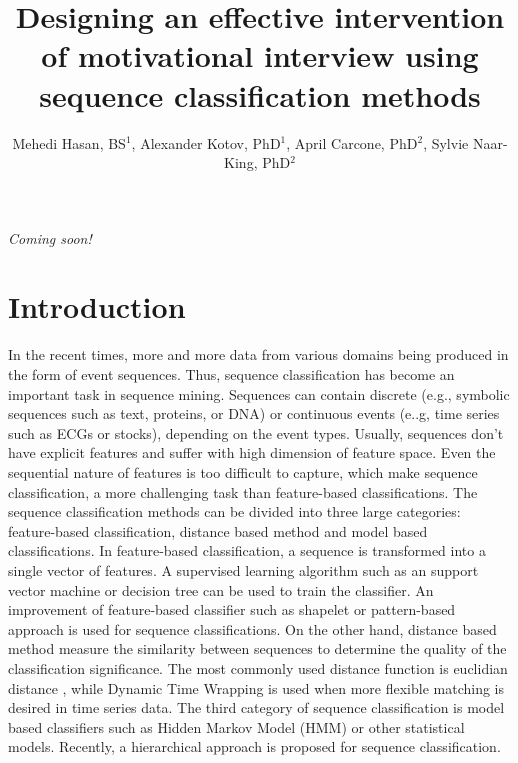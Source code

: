 \documentclass{amia}
\begin{document}
\title{Designing an effective intervention of motivational interview using sequence classification methods}

\author{Mehedi Hasan, BS$^{1}$, Alexander Kotov, PhD$^{1}$, April Carcone, PhD$^{2}$, Sylvie Naar-King, PhD$^{2}$}


\maketitle

\textit{Coming soon!}

\section*{Introduction}

In the recent times, more and more data from various domains being produced in the form of event sequences. Thus, sequence classification has become an important task in sequence mining. Sequences can contain discrete (e.g., symbolic sequences such as text, proteins, or DNA) or continuous events (e..g, time series such as ECGs or stocks), depending on the event types. Usually, sequences don't have explicit features and suffer with high dimension of feature space. Even the sequential nature of features is too difficult to capture, which make sequence classification, a more challenging task than feature-based classifications. The sequence classification methods can be divided into three large categories: feature-based classification, distance based method and model based classifications. In feature-based classification, a sequence is transformed into a single vector of features. A supervised learning algorithm such as an support vector machine \cite{leslie2004fast} or decision tree \cite{chuzhanova1998feature} can be used to train the classifier. An improvement of feature-based classifier such as shapelet \cite{ye2009time} or pattern-based \cite{kudenko1998feature, lesh1999mining} approach is used for sequence classifications. On the other hand, distance based method measure the similarity between sequences to determine the quality of the classification significance. The most commonly used distance function is euclidian distance \cite{keogh2003need}, while Dynamic Time Wrapping \cite{keogh2000scaling} is used when more flexible matching is desired in time series data. The third category of sequence classification is model based classifiers such as Hidden Markov Model \cite{rabiner1989tutorial} (HMM) or other statistical models. Recently, a hierarchical approach \cite{nallam2016effective} is proposed for sequence classification. 
\end{document}
